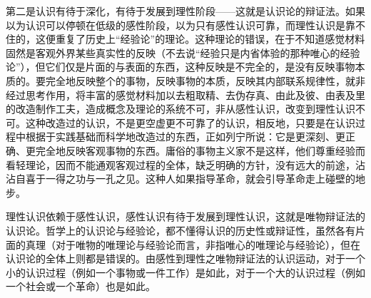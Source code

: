 \documentclass[UTF8, 12pt, a4paper]{ctexrep}
\begin{document}
第二是认识有待于深化，有待于发展到理性阶段——这就是认识论的辩证法。如果以为认识可以停顿在低级的感性阶段，以为只有感性认识可靠，而理性认识是靠不住的，这便重复了历史上“经验论”的理论。这种理论的错误，在于不知道感觉材料固然是客观外界某些真实性的反映（不去说“经验只是内省体验的那种唯心的经验论”），但它们仅是片面的与表面的东西，这种反映是不完全的，是没有反映事物本质的。要完全地反映整个的事物，反映事物的本质，反映其内部联系规律性，就非经过思考作用，将丰富的感觉材料加以去粗取精、去伪存真、由此及彼、由表及里的改造制作工夫，造成概念及理论的系统不可，非从感性认识，改变到理性认识不可。这种改造过的认识，不是更空虚更不可靠了的认识，相反地，只要是在认识过程中根据于实践基础而科学地改造过的东西，正如列宁所说：它是更深刻、更正确、更完全地反映客观事物的东西。庸俗的事物主义家不是这样，他们尊重经验而看轻理论，因而不能通观客观过程的全体，缺乏明确的方针，没有远大的前途，沾沾自喜于一得之功与一孔之见。这种人如果指导革命，就会引导革命走上碰壁的地步。

理性认识依赖于感性认识，感性认识有待于发展到理性认识，这就是唯物辩证法的认识论。哲学上的认识论与经验论，都不懂得认识的历史性或辩证性，虽然各有片面的真理（对于唯物的唯理论与经验论而言，非指唯心的唯理论与经验论），但在认识论的全体上则都是错误的。由感性到理性之唯物辩证法的认识运动，对于一个小的认识过程（例如一个事物或一件工作）是如此，对于一个大的认识过程（例如一个社会或一个革命）也是如此。
\end{document}
